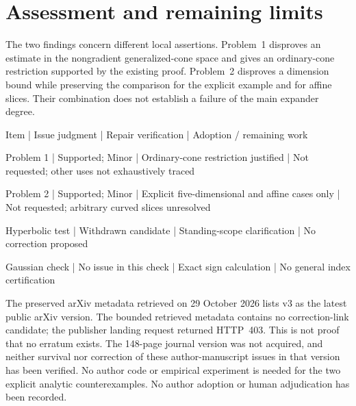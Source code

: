\documentclass[10pt]{article}
\begin{document}
\section*{Assessment and remaining limits}
The two findings concern different local assertions. Problem 1 disproves an estimate in the nongradient generalized-cone space and gives an ordinary-cone restriction supported by the existing proof. Problem 2 disproves a dimension bound while preserving the comparison for the explicit example and for affine slices. Their combination does not establish a failure of the main expander degree.\par
Item | Issue judgment | Repair verification | Adoption / remaining work\par
Problem 1 | Supported; Minor | Ordinary-cone restriction justified | Not requested; other uses not exhaustively traced\par
Problem 2 | Supported; Minor | Explicit five-dimensional and affine cases only | Not requested; arbitrary curved slices unresolved\par
Hyperbolic test | Withdrawn candidate | Standing-scope clarification | No correction proposed\par
Gaussian check | No issue in this check | Exact sign calculation | No general index certification\par
The preserved arXiv metadata retrieved on 29 October 2026 lists v3 as the latest public arXiv version. The bounded retrieved metadata contains no correction-link candidate; the publisher landing request returned HTTP 403. This is not proof that no erratum exists. The 148-page journal version was not acquired, and neither survival nor correction of these author-manuscript issues in that version has been verified. No author code or empirical experiment is needed for the two explicit analytic counterexamples. No author adoption or human adjudication has been recorded.\par
\end{document}
